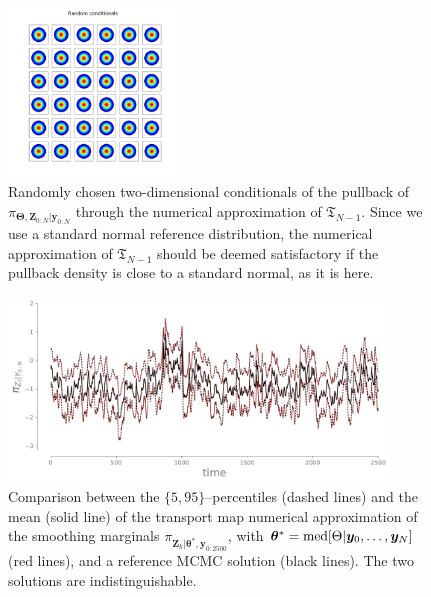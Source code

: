 \documentclass[twoside,11pt]{article}
\newcommand{\yb}{\boldsymbol{y}}
\newcommand{\Zb}{\boldsymbol{Z}}
\newcommand{\thetab}{\boldsymbol{\theta}}                              %
\newcommand{\vhyp}{\boldsymbol{\Theta}}
\begin{document}
\begin{figure}[H] %
  \begin{center}
     \includegraphics[width=0.40\textwidth, trim={0 0 0 1cm}, clip]{stocVol_random_conditionals} 
    \caption{ Randomly chosen two-dimensional conditionals of the pullback of 
      $\pi_{\vhyp, \Zb_{0:N} \vert \yb_{0:N}}$ 
      through the numerical approximation of
      $\mathfrak{T}_{N-1}$.
      Since we use a standard normal reference distribution, the
      numerical approximation of 
      $\mathfrak{T}_{N-1}$
      should be deemed satisfactory if the %
      pullback density
      is close to a standard normal, as it is here.
      }
    \label{fig:stoc-vol:pullback} 
  \end{center}
\end{figure}

%
%
%
%
%
%
%
%
%
%
%
%
%
%
%
%
%
%
%
%
%
%
%
%
%
%
%
%
%
%

\begin{figure}[H] %
  \begin{center}
        \includegraphics[width=0.90\textwidth, bb=25bp 0bp 650bp 290bp, clip]{smoothing-vs-unbiased-0-2500.pdf}   
    \caption{Comparison between the $\{5,95\}$--percentiles (dashed lines) and the mean 
    (solid line)
      of the transport map 
      numerical 
      approximation of the
      smoothing marginals $\pi_{ \Zb_{k} \vert \thetab^*, \yb_{0:2500}}$,
      with $\thetab^* = {\rm med}[ \Theta \vert \yb_0 ,\ldots, \yb_{N}
      ]$ (red lines), and a reference MCMC solution       %
      (black lines).
      The two solutions are indistinguishable.}
    \label{fig:stoc-vol:long-smooth-vs-unbiased} 
  \end{center}
\end{figure}
\end{document}

